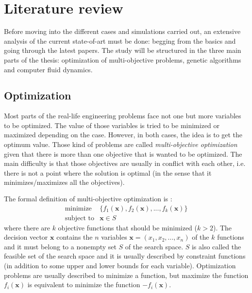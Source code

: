 \chapter{Literature review}
    
    Before moving into the different cases and simulations carried out, an extensive analysis of the current state-of-art must be done: begging from the basics and going through the latest papers. The study will be structured in the three main parts of the thesis: optimization of multi-objective problems, genetic algorithms and computer fluid dynamics.

\section{Optimization}

    Most parts of the real-life engineering problems face not one but more variables to be optimized. The value of those variables is tried to be minimized or maximized depending on the case. However, in both cases, the idea is to get the optimum value. Those kind of problems are called \textit{multi-objective optimization} given that there is more than one objective that is wanted to be optimized. The main difficulty is that those objectives are usually in conflict with each other, i.e. there is not a point where the solution is optimal (in the sense that it minimizes/maximizes all the objectives).
    
    The formal definition of multi-objective optimization is \cite{nonlinear}:
    \begin{equation}
        \begin{array}{cl}
            \textrm{minimize} & \{f_1(\bm{x}),f_2(\bm{x}),...,f_k(\bm{x})\} \\
            \textrm{subject to} & \bm{x} \in S
        \end{array}
        \label{eq:multiobjectiveDefnition}
    \end{equation}
    where there are $k$ objective functions that should be minimized ($k > 2$). The decision vector $\bm{x}$ contains the $n$ variables $\bm{x}=(x_1,x_2,...,x_n)$ of the $k$ functions and it must belong to a nonempty set $S$ of the search space. $S$ is also called the feasible set of the search space and it is usually described by constraint functions (in addition to some upper and lower bounds for each variable). Optimization problems are usually described to minimize a function, but maximize the function $f_i(\bm{x})$ is equivalent to minimize the function $-f_i(\bm{x})$.
    

